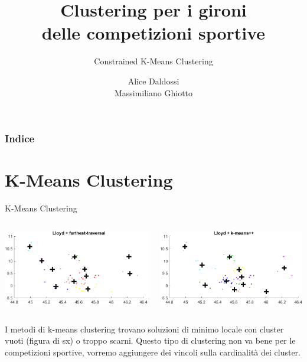 \documentclass{beamer}
\title{Clustering per i gironi \\delle competizioni sportive}
\subtitle{Constrained K-Means Clustering}
\author{Alice Daldossi \\ Massimiliano Ghiotto}
\institute{Università degli Studi di Pavia}
\date
\begin{document}
	
	\frame{\titlepage}
	
\begin{frame}
	\frametitle{Indice}
	\tableofcontents
\end{frame}

\section{K-Means Clustering}
\begin{frame}{K-Means Clustering}
	\begin{columns}
		\begin{column}{0.5\textwidth}
			\begin{center}
				\includegraphics[width=1\textwidth]{lloyd_ft.png}      
			\end{center}
		\end{column}
		\begin{column}{0.5\textwidth}
			\begin{center}
				\includegraphics[width=1\textwidth]{lloyd_kmpp.png}      
			\end{center}
		\end{column}
	\end{columns}
	\vspace{0.5cm}
	I metodi di k-means clustering trovano soluzioni di minimo locale con cluster vuoti (figura di sx) o troppo scarni. Questo tipo di clustering non va bene per le competizioni sportive, vorremo aggiungere dei vincoli sulla cardinalità dei cluster.
\end{frame}
\end{document}
